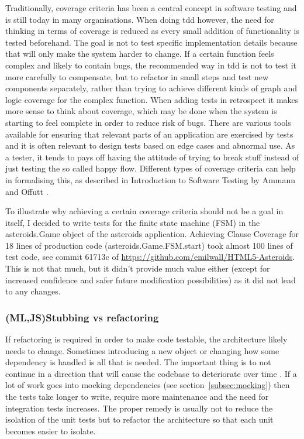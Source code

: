 \documentclass[11pt]{article}
\begin{document}
Traditionally, coverage criteria has been a central concept in software testing and is still today in many organisations. When doing \gls{tdd} however, the need for thinking in terms of coverage is reduced as every small addition of functionality is tested beforehand. The goal is not to test specific implementation details because that will only make the system harder to change. If a certain function feels complex and likely to contain bugs, the recommended way in \gls{tdd} is not to test it more carefully to compensate, but to refactor in small steps and test new components separately, rather than trying to achieve different kinds of graph and logic coverage for the complex function. When adding tests in retrospect it makes more sense to think about coverage, which may be done when the system is starting to feel complete in order to reduce risk of bugs. There are various tools available for ensuring that relevant parts of an application are exercised by tests and it is often relevant to design tests based on edge cases and abnormal use. As a tester, it tends to pays off having the attitude of trying to break stuff instead of just testing the so called happy flow. Different types of coverage criteria can help in formalising this, as described in Introduction to Software Testing by Ammann and Offutt \cite{AmmannOffutt}.

\label{subsec:coveragecriteria}

To illustrate why achieving a certain coverage criteria should not be a goal in itself, I decided to write tests for the finite state machine (FSM) in the asteroids.Game object of the asteroids application. Achieving Clause Coverage \cite[p.~106]{AmmannOffutt} for 18 lines of production code (asteroids.Game.FSM.start) took almost 100 lines of test code, see commit 61713c of \url{https://github.com/emilwall/HTML5-Asteroids}. This is not that much, but it didn't provide much value either (except for increased confidence and safer future modification possibilities) as it did not lead to any changes.

\subsubsection{(ML,JS)Stubbing vs refactoring}

If refactoring is required in order to make code testable, the architecture likely needs to change. Sometimes introducing a new object or changing how some dependency is handled is all that is needed. The important thing is to not continue in a direction that will cause the codebase to deteriorate over time \cite[question~34]{Stenmark}. If a lot of work goes into mocking dependencies (see section~\ref{subsec:mocking}) then the tests take longer to write, require more maintenance and the need for integration tests increases. The proper remedy is usually not to reduce the isolation of the unit tests but to refactor the architecture so that each unit becomes easier to isolate. \cite[question~42]{Stenmark}
\end{document}
